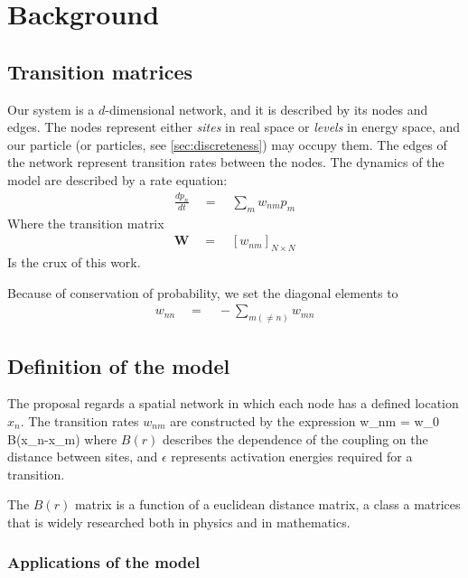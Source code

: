 \chapter{Background}

 
\section{Transition matrices}

Our system is a $d$-dimensional network, and it is
described by its nodes and edges. The nodes represent 
either {\em sites} in real space or {\em levels} in energy space, 
and our particle (or particles, see \ref{sec:discreteness}) may
occupy them. The edges of the network represent transition rates 
between the nodes. The dynamics of the model are described by 
a rate equation:
%
\begin{align}
\frac{dp_n}{dt} \quad = \quad \sum_m w_{nm}p_m
\end{align}
%
Where the transition matrix 
%
\begin{align}
\mathbf{W} \quad =  \quad \left[ w_{nm}\right]_{N\times N}
\end{align}
%
Is the crux of this work.

Because of conservation of probability, we set the diagonal
elements to
%
\begin{align}
w_{nn}\quad = \quad -\sum_{m(\ne n)} w_{mn}
\end{align}
%


\section{Definition of the model}


The proposal regards a spatial network in which each node
has a defined location $x_n$. The transition rates $w_{nm}$
are constructed by the expression
%
\beq
w_{nm} \quad = \quad w_0 B(x_n-x_m)
\eeq
%
where $B(r)$ describes the dependence of the coupling on the
distance between sites, and $\epsilon$ represents activation
energies required for a transition.


The $B(r)$ matrix is a function of a euclidean distance matrix,
a class a matrices that is widely researched 
\cite{skipetrov_eigenvalue_2011, goetschy_non-hermitian_2011,mezard_spectra_1999, bogomolny_spectral_2003}
both in physics and in mathematics.


\subsection{Applications of the model}


